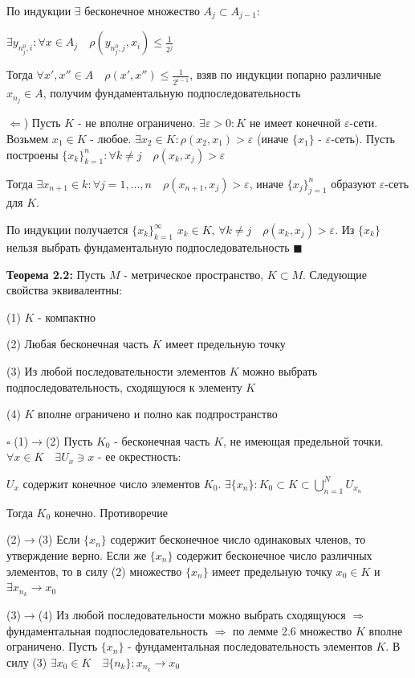 \documentclass[a4paper]{report}
\begin{document}
По индукции $\exists$ бесконечное множество $A_j\subset A_{j-1}\colon$

$\exists y_{n_j^0,i}\colon\forall x\in A_j\quad
\rho(y_{n_j^0,j},x_i)\le\displaystyle\frac{1}{2^j}$

Тогда $\forall x',x''\in A\quad\rho(x',x'')\le\displaystyle\frac{1}{2^{i-1}}$, взяв по индукции попарно различные $x_{n_j}\in A$,
получим фундаментальную подпоследовательность

$\Leftarrow$) Пусть $K$ - не вполне ограничено. $\exists\varepsilon>0\colon K$ не имеет конечной $\varepsilon$-сети.
Возьмем $x_1\in K$ - любое. $\exists x_2\in K\colon\rho(x_2,x_1)>\varepsilon$ (иначе $\{x_1\}$ - $\varepsilon$-сеть).
Пусть построены $\{x_k\}_{k=1}^n\colon\forall k\ne j\quad\rho(x_k,x_j)>\varepsilon$

Тогда $\exists x_{n+1}\in k\colon\forall j=1,\ldots,n\quad\rho(x_{n+1},x_j)>\varepsilon$, иначе $\{x_j\}_{j=1}^n$ образуют
$\varepsilon$-сеть для $K$.

По индукции получается $\{x_k\}_{k=1}^\infty$ $x_k\in K$, $\forall k\ne j\quad\rho(x_k,x_j)>\varepsilon$. Из $\{x_k\}$
нельзя выбрать фундаментальную подпоследовательность $\blacksquare$
\bigskip

\noindent\textbf{Теорема 2.2:} Пусть $M$ - метрическое пространство, $K\subset M$. Следующие свойства эквивалентны:

(1) $K$ - компактно

(2) Любая бесконечная часть $K$ имеет предельную точку

(3) Из любой последовательности элементов $K$ можно выбрать подпоследовательность, сходящуюся к элементу $K$

(4) $K$ вполне ограничено и полно как подпространство

\noindent $\square$ (1)$\to$(2) Пусть $K_0$ - бесконечная часть $K$, не имеющая предельной точки. $\forall x\in K\quad
\exists U_x\ni x$ - ее окрестность:

$U_x$ содержит конечное число элементов $K_0$. $\exists\{x_n\}\colon K_0\subset K\subset\bigcup\limits_{n=1}^N U_{x_n}$

Тогда $K_0$ конечно. Противоречие

(2)$\to$(3) Если $\{x_n\}$ содержит бесконечное число одинаковых членов, то утверждение верно. Если же $\{x_n\}$ содержит
бесконечное число различных элементов, то в силу (2) множество $\{x_n\}$ имеет предельную точку $x_0\in K$ и $\exists
x_{n_k}\to x_0$

(3)$\to$(4) Из любой последовательности можно выбрать сходящуюся $\Rightarrow$ фундаментальная подпоследовательность
$\Rightarrow$ по лемме 2.6 множество $K$ вполне ограничено. Пусть $\{x_n\}$ - фундаментальная последовательность элементов
$K$. В силу (3) $\exists x_0\in K\quad\exists\{n_k\}\colon x_{n_k}\to x_0$
\end{document}
